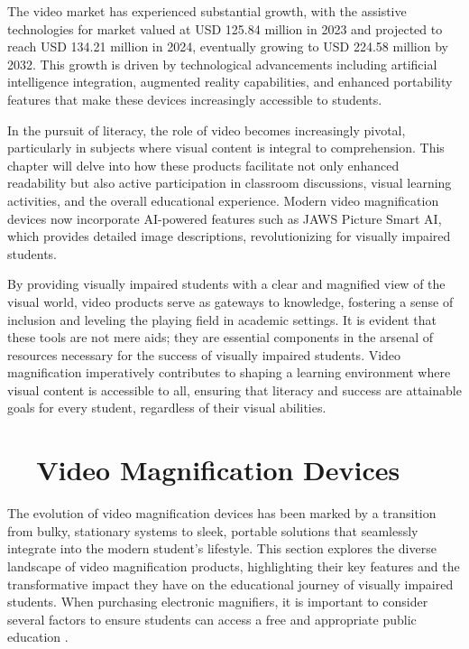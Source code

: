 The video  market has experienced substantial growth, with the assistive technologies for  market valued at USD 125.84 million in 2023 and projected to reach USD 134.21 million in 2024, eventually growing to USD 224.58 million by 2032. This growth is driven by technological advancements including artificial intelligence integration, augmented reality capabilities, and enhanced portability features that make these devices increasingly accessible to students.\supercite{BrailleMarketResearch}

In the pursuit of literacy, the role of video  becomes increasingly pivotal, particularly in subjects where visual content is integral to comprehension. This chapter will delve into how these products facilitate not only enhanced readability but also active participation in classroom discussions, visual learning activities, and the overall educational experience. Modern video magnification devices now incorporate AI-powered features such as JAWS Picture Smart AI, which provides detailed image descriptions, revolutionizing  for visually impaired students.\supercite{JAWSAILabeler, msseeingai}

By providing visually impaired students with a clear and magnified view of the visual world, video  products serve as gateways to knowledge, fostering a sense of inclusion and leveling the playing field in academic settings. It is evident that these tools are not mere aids; they are essential components in the arsenal of resources necessary for the success of visually impaired students. Video magnification imperatively contributes to shaping a learning environment where visual content is accessible to all, ensuring that literacy and success are attainable goals for every student, regardless of their visual abilities.\supercite{Kelly2011, Burgstahler2015}

\section{~~Video Magnification Devices}\label{ch6:sec:video-magnification-devices}
The evolution of video magnification devices has been marked by a transition from bulky, stationary systems to sleek, portable solutions that seamlessly integrate into the modern student's lifestyle. This section explores the diverse landscape of video magnification products, highlighting their key features and the transformative impact they have on the educational journey of visually impaired students. When purchasing electronic magnifiers, it is important to consider several factors to ensure students can access a free and appropriate public education \supercite{PerkinsVideoMagnifier}.

